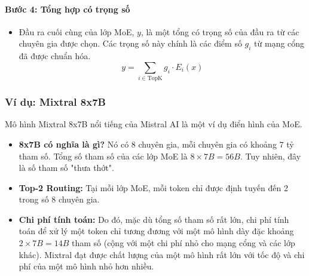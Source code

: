\paragraph{Bước 4: Tổng hợp có trọng số}
\begin{itemize}
    \item Đầu ra cuối cùng của lớp MoE, $y$, là một tổng có trọng số của đầu ra từ các chuyên gia được chọn. Các trọng số này chính là các điểm số $g_i$ từ mạng cổng đã được chuẩn hóa.
    $$ y = \sum_{i \in \text{TopK}} g_i \cdot E_i(x) $$
\end{itemize}

\subsubsection{Ví dụ: Mixtral 8x7B}
Mô hình Mixtral 8x7B nổi tiếng của Mistral AI là một ví dụ điển hình của MoE.
\begin{itemize}
    \item \textbf{8x7B có nghĩa là gì?} Nó có 8 chuyên gia, mỗi chuyên gia có khoảng 7 tỷ tham số. Tổng số tham số của các lớp MoE là $8 \times 7B = 56B$. Tuy nhiên, đây là số tham số "thưa thớt".
    \item \textbf{Top-2 Routing:} Tại mỗi lớp MoE, mỗi token chỉ được định tuyến đến 2 trong số 8 chuyên gia.
    \item \textbf{Chi phí tính toán:} Do đó, mặc dù tổng số tham số rất lớn, chi phí tính toán để xử lý một token chỉ tương đương với một mô hình dày đặc khoảng $2 \times 7B = 14B$ tham số (cộng với một chi phí nhỏ cho mạng cổng và các lớp khác). Mixtral đạt được chất lượng của một mô hình rất lớn với tốc độ và chi phí của một mô hình nhỏ hơn nhiều.
\end{itemize}
